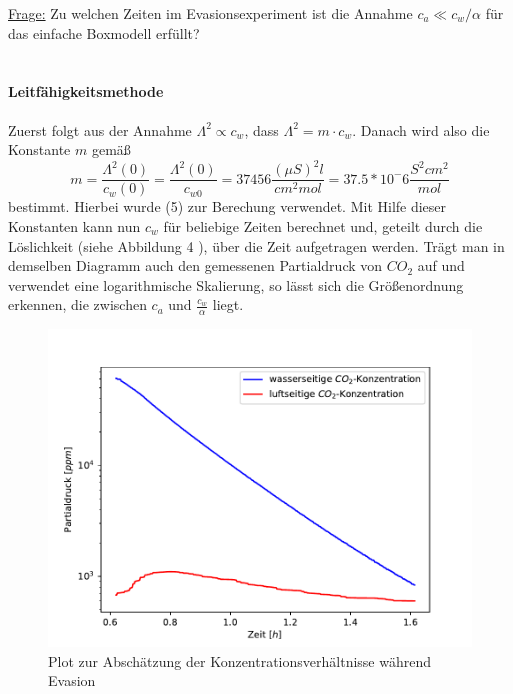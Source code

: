 \documentclass[12pt]{article}
\begin{document}
\underline{Frage:} Zu welchen Zeiten im Evasionsexperiment ist die Annahme $c_a \ll c_w/\alpha $ für das einfache Boxmodell erfüllt? \\ \\

\paragraph{Leitfähigkeitsmethode\\}

Zuerst folgt aus der Annahme $\Lambda ^2 \propto c_w $, dass $\Lambda ^2 = m \cdot c_w $. Danach wird also die Konstante $m$ gemäß
\begin{equation}
m = \frac{\Lambda^2(0)}{c_w(0)} = \frac{\Lambda^2(0)}{c_{w0}} = 37456 \frac{(\mu S)^2 l}{cm^2 mol} = 37.5 * 10^-6 \frac{S^2 cm^2}{mol}
\end{equation}
bestimmt. Hierbei wurde (5) zur Berechung verwendet. Mit Hilfe dieser Konstanten kann nun $c_w$ für beliebige Zeiten berechnet und, geteilt durch die Löslichkeit (siehe Abbildung 4 \cite{jaehne}), über die Zeit aufgetragen werden. Trägt man in demselben Diagramm auch den gemessenen Partialdruck von $CO_2$ auf und verwendet eine logarithmische Skalierung, so lässt sich die Größenordnung erkennen, die zwischen $c_a$ und $\frac{c_w}{\alpha}$ liegt.

\begin{figure}[H]
	\centering
	\includegraphics[width=120mm]{VE-Wasser/LeitfaehigkeitQuadrat.pdf}
	\caption{Plot zur Abschätzung der Konzentrationsverhältnisse während Evasion}
\end{figure}
\end{document}
